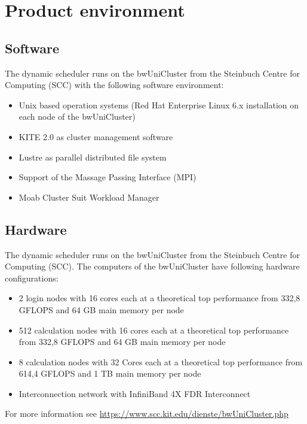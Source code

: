 \section{Product environment}
	\subsection{Software}
	The dynamic scheduler runs on the bwUniCluster from the Steinbuch Centre for Computing (SCC) with the following software environment:
	\begin{itemize}
		\item Unix based operation systems (Red Hat Enterprise Linux 6.x installation on each node of the bwUniCluster)
		\item KITE 2.0 as cluster management software
		\item Lustre as parallel distributed file system
		\item Support of the Massage Passing Interface (MPI)
		\item Moab Cluster Suit Workload Manager
	\end{itemize}
	\subsection{Hardware}
	The dynamic scheduler runs on the bwUniCluster from the Steinbuch Centre for Computing (SCC). The computers of the bwUniCluster have following hardware configurations:
		\begin{itemize}
			\item 2 login nodes with 16 cores each at a theoretical top performance from 332,8 GFLOPS and 64 GB main memory per node 
			\item 512 calculation nodes with 16 cores each at a theoretical top performance from 332,8 GFLOPS and 64 GB main memory per node
			\item 8 calculation nodes with 32 Cores each at a theoretical top performance from 614,4 GFLOPS and 1 TB main memory per node
			\item Interconnection network with InfiniBand 4X FDR Interconnect
		\end{itemize}
		For more information see \href{https://www.scc.kit.edu/dienste/bwUniCluster.php}{https://www.scc.kit.edu/dienste/bwUniCluster.php}
    
 